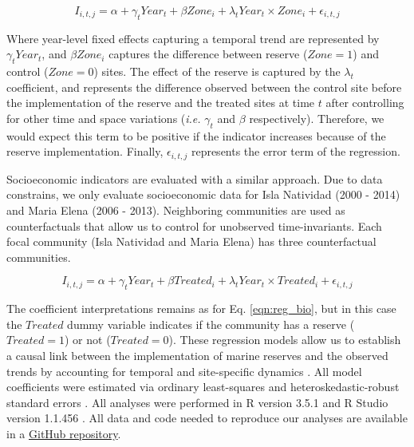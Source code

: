\documentclass{frontiersSCNS}
\begin{document}
\begin{equation}
I_{i,t,j} = \alpha + \gamma_{t} Year_t + \beta Zone_i + \lambda_{t} Year_t\times Zone_i + \epsilon_{i,t,j}
\label{eqn:reg_bio}
\end{equation}

Where year-level fixed effects capturing a temporal trend are
represented by \(\gamma_t Year_t\), and \(\beta Zone_i\) captures the
difference between reserve (\(Zone = 1\)) and control (\(Zone = 0\))
sites. The effect of the reserve is captured by the \(\lambda_t\)
coefficient, and represents the difference observed between the control
site before the implementation of the reserve and the treated sites at
time \(t\) after controlling for other time and space variations
(\emph{i.e.} \(\gamma_t\) and \(\beta\) respectively). Therefore, we
would expect this term to be positive if the indicator increases because
of the reserve implementation. Finally, \(\epsilon_{i,t,j}\) represents
the error term of the regression.

Socioeconomic indicators are evaluated with a similar approach. Due to
data constrains, we only evaluate socioeconomic data for Isla Natividad
(2000 - 2014) and Maria Elena (2006 - 2013). Neighboring communities are
used as counterfactuals that allow us to control for unobserved
time-invariants. Each focal community (Isla Natividad and Maria Elena)
has three counterfactual communities.

\begin{equation}
I_{i,t,j} = \alpha + \gamma_{t} Year_t + \beta Treated_i + \lambda_{t} Year_t\times Treated_i +\epsilon_{i,t,j}
\label{eqn:soc_reg}
\end{equation}

The coefficient interpretations remains as for Eq. \ref{eqn:reg_bio},
but in this case the \(Treated\) dummy variable indicates if the
community has a reserve (\(Treated = 1\)) or not (\(Treated = 0\)).
These regression models allow us to establish a causal link between the
implementation of marine reserves and the observed trends by accounting
for temporal and site-specific dynamics \citep{depalma_2018}. All model
coefficients were estimated via ordinary least-squares and
heteroskedastic-robust standard errors \citep{zeileis_2004-7n}. All
analyses were performed in R version 3.5.1 and R Studio version 1.1.456
\citep{R_2018}. All data and code needed to reproduce our analyses are
available in a \href{https://github.com/jcvdav/ReserveEffect}{GitHub
repository}.
\end{document}
